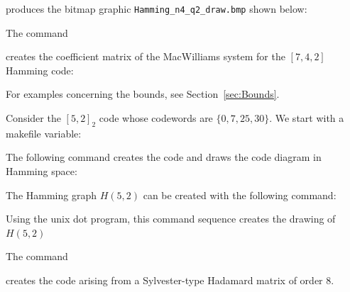 
produces the bitmap graphic \verb'Hamming_n4_q2_draw.bmp'
shown below:




\bigskip


The command


creates the coefficient matrix of 
the MacWilliams system for the $[7,4,2]$ Hamming code:



\bigskip

For examples concerning the bounds, see Section~\ref{sec:Bounds}.

\bigskip



Consider the $[5,2]_2$ code whose codewords are $\{0,7,25,30\}$.
We start with a makefile variable:


The following command creates the code 
and draws the code diagram in Hamming space:


The Hamming graph $H(5,2)$ can be 
created with the following command:


Using the unix dot program, 
this command sequence creates the drawing of $H(5,2)$ 

\bigskip

The command 


creates the code arising from a Sylvester-type Hadamard matrix of order 8. 

\bigskip

